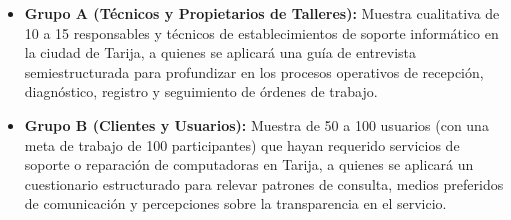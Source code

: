 \begin{itemize}
\item \textbf{Grupo A (Técnicos y Propietarios de Talleres):} Muestra cualitativa de 10 a 15 responsables y técnicos de establecimientos de soporte informático en la ciudad de Tarija, a quienes se aplicará una guía de entrevista semiestructurada para profundizar en los procesos operativos de recepción, diagnóstico, registro y seguimiento de órdenes de trabajo.
\item \textbf{Grupo B (Clientes y Usuarios):} Muestra de 50 a 100 usuarios (con una meta de trabajo de 100 participantes) que hayan requerido servicios de soporte o reparación de computadoras en Tarija, a quienes se aplicará un cuestionario estructurado para relevar patrones de consulta, medios preferidos de comunicación y percepciones sobre la transparencia en el servicio.
\end{itemize}